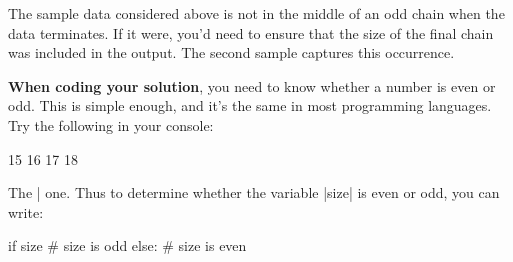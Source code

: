 The sample data considered above is not in the middle of an odd chain when the data
terminates. If it were, you'd need to ensure that the size of the final chain was included
in the output. The second sample captures this occurrence.

\bigskip
\textbf{When coding your solution}, you need to know whether a number is even or odd. This
is simple enough, and it's the same in most programming languages. Try the following in
your console:
\begin{pythoncode}
  15 %
  16 %
  17 %
  18 %
\end{pythoncode}

The \pycode|%
one. Thus to determine whether the variable \pycode|size| is even or odd, you can write:
\begin{pythoncode}
  if size %
    # size is odd
  else:
    # size is even
\end{pythoncode}

